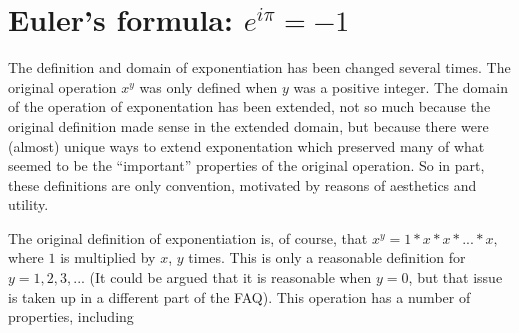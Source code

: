 \section{Euler's formula: $e^{i \pi} = - 1 $}

The definition and domain of exponentiation has been changed several
 times.  The original operation $x^y$ was only defined when $y$
was a positive integer.  The domain of the operation of
exponentation has been extended, not so much because the original
definition made sense in the extended domain, but because there were
(almost) unique ways to extend exponentation which preserved many of
what seemed to be the ``important'' properties of the original operation.
So in part, these definitions are only convention, motivated by
reasons of aesthetics and utility.

The original definition of exponentiation is, of course, that $x^y = 1 * x *
x * ... * x,$ where $1$ is multiplied by $x$,  $y$ times.  This is only
a reasonable definition for $y=1, 2, 3, ...$  (It could be argued that it
is reasonable when $y=0$, but that issue is taken up in a different part
of the FAQ).  This operation has a number of properties, including

